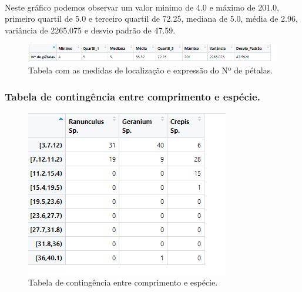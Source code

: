 \documentclass{article}
\begin{document}
\paragraph{}Neste gráfico podemos observar um valor minimo de 4.0 e máximo de 201.0, primeiro quartil de 5.0 e terceiro quartil de 72.25, mediana de 5.0, média de 2.96, variância de 2265.075 e desvio padrão de 47.59.

\begin{figure}[h]
       \centering %
        \includegraphics[scale=0.8]{tabela_nopetala.png} 
       \caption{Tabela com as medidas de localização e expressão do Nº de pétalas.}
       \label{fig:logo}
    \end{figure}
    
\paragraph{}
\paragraph{}

\subsubsection{Tabela de contingência entre comprimento e espécie.}
\begin{figure}[h]
       \centering %
        \includegraphics[scale=0.8]{tabela_do_comprimento_em_classe_com_especie.png} 
       \caption{Tabela de contingência entre comprimento e espécie.}
       \label{fig:logo}
    \end{figure}
    
\end{document}
